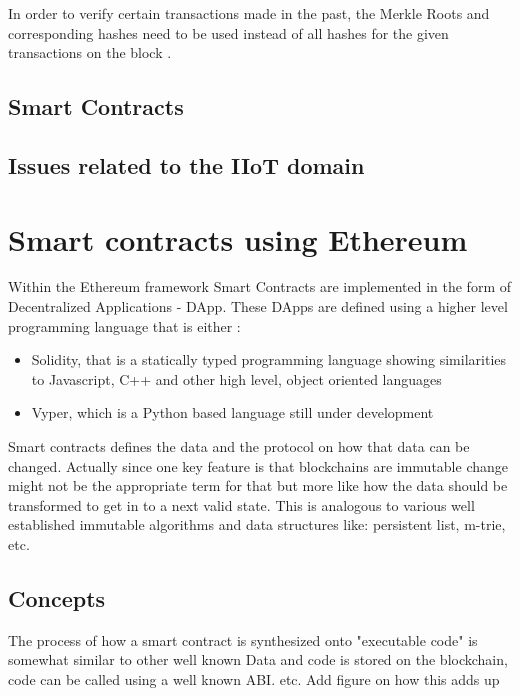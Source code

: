 \documentclass[a4paper]{article}
\begin{document}
In order to verify certain transactions made in the past, the Merkle Roots and corresponding hashes need to be used instead of all hashes for the given transactions on the block \cite{IOTA_Merkle}. 



\subsection{Smart Contracts}

\subsection{Issues related to the IIoT domain}


\section{Smart contracts using Ethereum}

Within the Ethereum framework Smart Contracts are implemented in the form of Decentralized Applications - DApp. These DApps are defined using a higher level programming language that is either :
\begin{itemize}
    \item Solidity, that is a statically typed programming language showing similarities to Javascript, C++ and other high level, object oriented languages \cite{solidity_manual}
    \item Vyper, which is a Python based language still under development \cite{vyper_doc}
\end{itemize}

Smart contracts defines the data and the protocol on how that data can be changed. Actually since one key feature is that blockchains are immutable change might not be the appropriate term for that but more like how the data should be transformed to get in to a next valid state. This is analogous to various well established immutable algorithms and data structures like: persistent list, m-trie, etc. \cite{persistent_data_structures} 

\subsection{Concepts}\label{sec:EthSmartContracConcepts}

The process of how a smart contract is synthesized onto "executable code" is somewhat similar to other well known 
Data and code is stored on the blockchain, code can be called using a well known ABI. etc. Add figure on how this adds up
\end{document}
